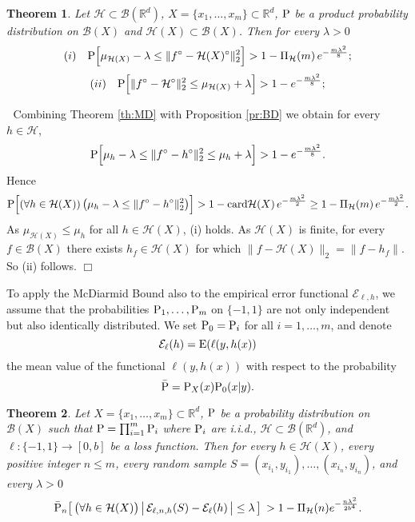 \documentclass{elsarticle}
\def\n{\noindent}
\def\bop{\noindent {\bf Proof.}$ \;$ }
\def\eop{\hfill $\Box$ \vspace{0.3 true cm}}
\def\card{{\rm card}}
\def\P{{\rm P}}
\def\E{{\rm E}}
\def\cE{{\mathcal E}}
\def\cH{{\mathcal H}}
\def\cB{{\mathcal B}}
\def\bR{{\mathbb R}}
\def\n{\noindent}
\def\bop{\noindent {\bf Proof.\ }}
\def\card{{\rm card}}
\def\bop{\noindent {\bf Proof.}$ \;$ }
\def\eop{\hfill $\Box$ \vspace{0.5cm}}
\newtheorem{theorem}{Theorem}[section]
\begin{document}
\begin{theorem}
Let $\cH \subset \cB(\bR^d)$, $X=\{x_1, \dots, x_m\} \subset \bR^d$, $\P$ be a product probability distribution on $\cB(X)$ and $\cH(X) \subset \cB(X)$. Then for every $\lambda>0$\\
$$ (i)  \quad \P \Bigl [ \mu_{\cH(X)} -\lambda \leq \|f^{\circ} - \cH(X)^{\circ} \|^2_2 \Bigr ] > 1 - \Pi_{\cH}(m) \, e^{-\frac{m\lambda^2}{8}};$$
$$ (ii)  \quad \P \Bigl [ \|f^{\circ} - \cH^{\circ} \|^2_2 \leq \mu_{\cH(X)} + \lambda \Bigr ] > 1 - e^{-\frac{m\lambda^2}{8}}  ;$$
\label{th:l2H}
\end{theorem}

\bop
Combining Theorem \ref{th:MD} with Proposition \ref{pr:BD} we obtain for every $h \in \cH$,
\begin{equation}
\P \Bigl [ \mu_h -\lambda\leq  \| f^{\circ} - h^{\circ} \|^2_2
\leq  \mu_h + \lambda \Bigr ] > 1- e^{-\frac{m\lambda^2}{8}}.
\label{eq:h}
\end{equation}
Hence $$\P \Bigl [ ( \forall h \in \cH(X))\, \bigl ( \mu_h -\lambda\leq  \| f^{\circ} - h^{\circ} \|^2_2 \bigr ) \Bigr ]
> 1- \card \cH(X) \, e^{-\frac{m\lambda^2}{2}} \geq 1 - \Pi_{\cH}(m) \, e^{-\frac{m\lambda^2}{2}}.$$
\n As $\mu_{\cH(X)} \leq \mu_h$ for all $h \in \cH(X)$,  (i) holds.
As $\cH(X)$ is finite, for every $f \in \cB(X)$ there exists  $h_f \in \cH(X)$ for which $\| f - \cH(X)\|_2 = \| f - h_f\|$.
So (ii) follows.
\eop


To apply the McDiarmid Bound also to the empirical error functional $\cE_{\ell,h}$, we assume that the probabilities $\P_1, \dots, \P_m$ on $\{-1,1\}$ are not only independent but also identically distributed. We set $\P_0 = \P_i$ for all $i=1, \dots, m$, and denote
$$\cE_{\ell}(h) = \E(\ell(y,h(x))$$
\n the mean value of the functional $\ell(y, h(x))$ with respect to the probability $${\bar \P} =\P_X(x)\P_0(x|y).$$

\begin{theorem}
Let $X=\{x_1, \dots, x_m\} \subset \bR^d$, $\P$ be a probability distribution on $\cB(X)$ such that  $\P= \prod_{i=1}^m \P_i$ where $\P_i$ are i.i.d.,
$\cH \subset \cB(\bR^d)$, and $\ell: \{-1,1\}  \to [0,b]$ be a loss function. Then for every $h \in \cH(X)$, every positive integer $n \leq m$, every random sample $S=(x_{i_1}, y_{i_1}), \dots, (x_{i_n}, y_{i_n})$, and every $\lambda >0$
$${\bar \P_n} \bigl [ \, \bigl ( \forall h \in \cH(X) \bigr ) \left | \, \cE_{\ell,n,h}(S) - \cE_{\ell}(h) \, \bigr  |  \leq \lambda \, \right ]\,  > 1-  \Pi_{\cH}(n) e^{-\frac{n \lambda^2}{2b^4}}.$$
\label{th:empH}
\end{theorem}
\end{document}
